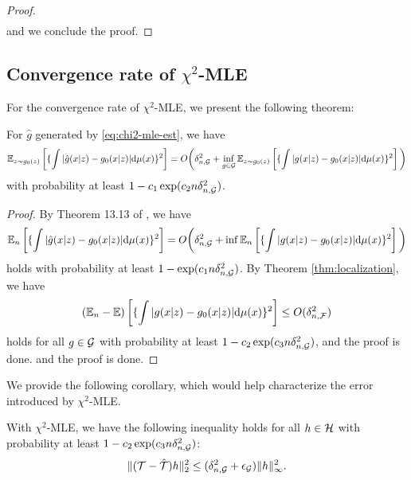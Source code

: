 \begin{proof}
\begin{align*}
\end{align*}
and we conclude the proof.
\end{proof}
\subsection{Convergence rate of $\chi^2$-MLE}
For the convergence rate of $\chi^2$-MLE, we present the following theorem: \begin{theorem}
For $\hat{g}$ generated by \ref{eq:chi2-mle-est}, we have 
    $$\mathbb{E}_{z \sim g_0(z)}\left[\{\int |\hat g(x|z)-g_0(x|z)| \mathrm{d}\mu(x)\}^2\right]=O\bigg(\delta_{n,\mathcal{G}}^2+\inf_{g\in \mathcal{G}}\mathbb{E}_{z \sim g_0(z)}\left[\{\int | g(x|z)-g_0(x|z)| \mathrm{d}\mu(x)\}^2\right]\bigg)$$
with probability at least $1 - c_1 \exp(c_2n\delta_{n,\mathcal{G}}^2)$.
\end{theorem}
\begin{proof}
    By Theorem 13.13 of \citet{wainwright2019high}, we have $$
    \mathbb{E}_n\left[\{\int |\hat g(x|z)-g_0(x|z)| \mathrm{d}\mu(x)\}^2\right] = O\bigg(\delta_{n,\mathcal{G}}^2+\inf \mathbb{E}_n\left[\{\int | g(x|z)-g_0(x|z)| \mathrm{d}\mu(x)\}^2\right]\bigg)
    $$ holds with probability at least $1- \exp(c_1 n\delta^2_{n,\mathcal{G}})$. By Theorem \ref{thm:localization}, we have $$
    (\mathbb{E}_n - \mathbb{E})\left[\{\int | g(x|z)-g_0(x|z)| \mathrm{d}\mu(x)\}^2\right] \leq O(\delta_{n,\mathcal{F}}^2)
    $$
    holds for all $g\in\mathcal{G}$ with probability at least $1 - c_2\exp(c_3 n\delta_{n,\mathcal{G}}^2 )$, and the proof is done.
    and the proof is done.
\end{proof}
We provide the following corollary, which would help characterize the error introduced by $\chi^2$-MLE.
\begin{corollary}\label{cor: T-chi2_mle}
    With $\chi^2$-MLE, we have the following inequality holds for all $h\in\mathcal{H}$ with probability at least $1 - c_2\exp(c_3 n\delta_{n,\mathcal{G}}^2 )$: \begin{align*}
    \|({\mathcal{T}} - \hat{{\mathcal{T}}}) h\|_2^2 \leq (\delta_{n,\mathcal{G}}^2+\epsilon_{\mathcal{G}}) \|h\|_\infty^2 .
\end{align*}
\end{corollary}
